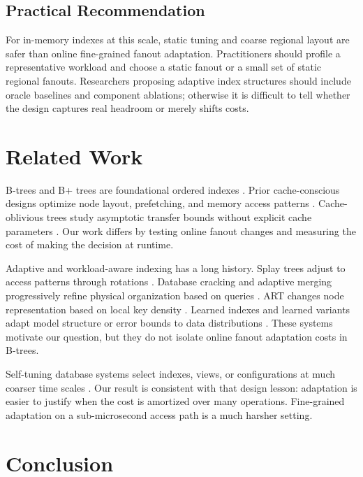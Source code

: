 \documentclass[sigconf,screen]{acmart}
\begin{document}
\subsection{Practical Recommendation}

For in-memory indexes at this scale, static tuning and coarse regional layout
are safer than online fine-grained fanout adaptation.  Practitioners should
profile a representative workload and choose a static fanout or a small set of
static regional fanouts.  Researchers proposing adaptive index structures
should include oracle baselines and component ablations; otherwise it is
difficult to tell whether the design captures real headroom or merely shifts
costs.

\section{Related Work}

B-trees and B+ trees are foundational ordered indexes
\cite{bayer1972organization,comer1979ubiquitous,graefe2011modern}.  Prior
cache-conscious designs optimize node layout, prefetching, and memory access
patterns \cite{rao1999cache,rao2000making,chen2001fractal}.  Cache-oblivious
trees study asymptotic transfer bounds without explicit cache parameters
\cite{bender2000cache}.  Our work differs by testing online fanout changes and
measuring the cost of making the decision at runtime.

Adaptive and workload-aware indexing has a long history.  Splay trees adjust
to access patterns through rotations \cite{sleator1985self}.  Database
cracking and adaptive merging progressively refine physical organization based
on queries \cite{idreos2007database,idreos2011adaptive}.  ART changes node
representation based on local key density \cite{leis2013adaptive}.  Learned
indexes and learned variants adapt model structure or error bounds to data
distributions \cite{kraska2018case,ding2020alex,galakatos2019fiting}.  These
systems motivate our question, but they do not isolate online fanout adaptation
costs in B-trees.

Self-tuning database systems select indexes, views, or configurations at much
coarser time scales \cite{chaudhuri1998autoadmin,weikum2002selftuning,
pavlo2017selfdriving}.  Our result is consistent with that design lesson:
adaptation is easier to justify when the cost is amortized over many
operations.  Fine-grained adaptation on a sub-microsecond access path is a much
harsher setting.

\section{Conclusion}
\end{document}
